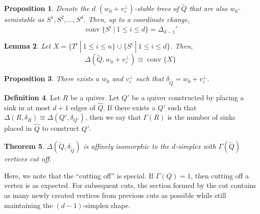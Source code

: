 \documentclass[11pt]{amsart}
\theoremstyle{plain}
\newtheorem{theorem}{Theorem}[section]
\newtheorem{lemma}[theorem]{Lemma}
\newtheorem{proposition}[theorem]{Proposition}
\theoremstyle{definition}
\newtheorem{definition}[theorem]{Definition}
\DeclareMathOperator{\conv}{conv}
\begin{document}
\begin{proposition}
    Denote the $d$ $(w_0 + v_\varepsilon^\perp)$-stable trees of $\widetilde{Q}$ that are also $w_0$-semistable as $S^1, S^2, \ldots, S^d$. Then, up to a coordinate change,
    \[
        \conv\{S^i \:|\: 1 \leq i \leq d\} = \Delta_{d-1}'
    \]
\end{proposition}

\begin{lemma}
    Let $X = \{T^i \:|\: 1 \leq i \leq n\}\cup\{S^i \:|\: 1 \leq i \leq d\}$. Then, 
    \[
        \Delta(\widetilde{Q}, w_0 + v_\varepsilon^\perp) \cong \conv\{X\}
    \]
\end{lemma}

\begin{proposition}
    There exists a $w_0$ and $v_\varepsilon^\perp$ such that $\delta_{\widetilde{Q}} = w_0 + v_\varepsilon^\perp$.
\end{proposition}

\begin{definition}
    Let $R$ be a quiver. Let $Q'$ be a quiver constructed  by placing a sink in at most $d+1$ edges of $\hat{Q}$. If there exists a $Q'$ such that $\Delta(R, \delta_R) \cong \Delta(Q', \delta_{Q'})$, then we say that $\Gamma(R)$ is the number of sinks placed in $\hat{Q}$ to construct $Q'$.
\end{definition}

\begin{theorem}
    $\Delta(\widetilde{Q}, \delta_{\widetilde{Q}})$ is affinely isomorphic to the $d$-simplex with $\Gamma(\widetilde{Q})$ vertices cut off.
\end{theorem}

Here, we note that the ``cutting off'' is special. If $\Gamma(Q) = 1$, then cutting off a vertex is as expected. For subsequent cuts, the section formed by the cut contains as many newly created vertices from previous cuts as possible while still maintaining the $(d-1)$-simplex shape.



\newpage

 
\end{document}
